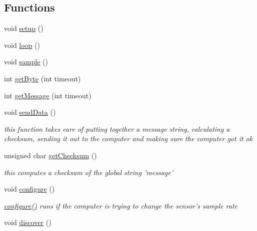 \subsection*{Functions}
\begin{CompactItemize}
\item 
void \hyperlink{temperature__sensor___terciopelo_8pde_4fc01d736fe50cf5b977f755b675f11d}{setup} ()
\item 
void \hyperlink{temperature__sensor___terciopelo_8pde_fe461d27b9c48d5921c00d521181f12f}{loop} ()
\item 
void \hyperlink{temperature__sensor___terciopelo_8pde_50a2ce599e896bfb535e70a42003ed23}{sample} ()
\item 
int \hyperlink{temperature__sensor___terciopelo_8pde_f8c68e93feeba5b9244094043672bac0}{getByte} (int timeout)
\item 
int \hyperlink{temperature__sensor___terciopelo_8pde_8f2521044963073c55b3c290fffd79e3}{getMessage} (int timeout)
\item 
void \hyperlink{temperature__sensor___terciopelo_8pde_95b1b253ee46df6a93285803cf1f3370}{sendData} ()
\begin{CompactList}\small\item\em this function takes care of putting together a message string, calculating a checksum, sending it out to the computer and making sure the computer got it ok \item\end{CompactList}\item 
unsigned char \hyperlink{temperature__sensor___terciopelo_8pde_465a79dc430d1e52a5b540920da744ca}{getChecksum} ()
\begin{CompactList}\small\item\em this computes a checksum of the global string 'message' \item\end{CompactList}\item 
void \hyperlink{temperature__sensor___terciopelo_8pde_e369b3765489ee8bd0ea791c1843630f}{configure} ()
\begin{CompactList}\small\item\em \hyperlink{nublogger_8h_e369b3765489ee8bd0ea791c1843630f}{configure()} runs if the computer is trying to change the sensor's sample rate \item\end{CompactList}\item 
void \hyperlink{temperature__sensor___terciopelo_8pde_3fdb2350c3f98c0de0f0ae3c831a8b14}{discover} ()

\end{CompactItemize}
